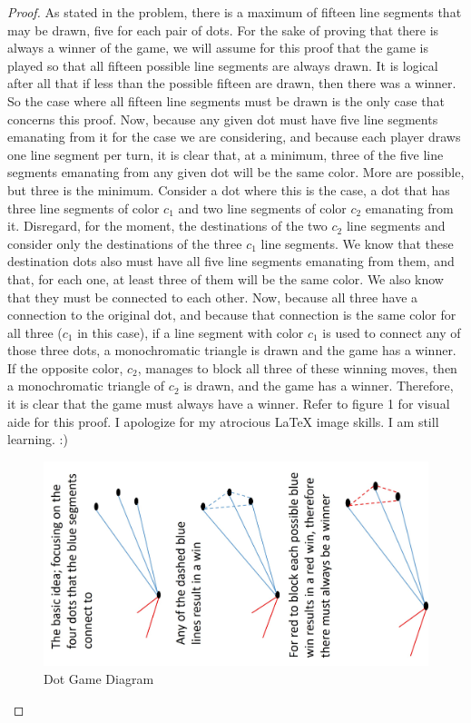 \documentclass[12pt]{article}
\begin{document}
\begin{proof}
As stated in the problem, there is a maximum of fifteen line segments that may be drawn, five for each pair of dots. For the sake of proving that there is always a winner of the game, we will assume for this proof that the game is played so that all fifteen possible line segments are always drawn. It is logical after all that if less than the possible fifteen are drawn, then there was a winner. So the case where all fifteen line segments must be drawn is the only case that concerns this proof. Now, because any given dot must have five line segments emanating from it for the case we are considering, and because each player draws one line segment per turn, it is clear that, at a minimum, three of the five line segments emanating from any given dot will be the same color. More are possible, but three is the minimum. Consider a dot where this is the case, a dot that has three line segments of color $c_1$ and two line segments of color $c_2$ emanating from it. Disregard, for the moment, the destinations of the two $c_2$ line segments and consider only the destinations of the three $c_1$ line segments. We know that these destination dots also must have all five line segments emanating from them, and that, for each one, at least three of them will be the same color. We also know that they must be connected to each other. Now, because all three have a connection to the original dot, and because that connection is the same color for all three ($c_1$ in this case), if a line segment with color $c_1$ is used to connect any of those three dots, a monochromatic triangle is drawn and the game has a winner. If the opposite color, $c_2$, manages to block all three of these winning moves, then a monochromatic triangle of $c_2$ is drawn, and the game has a winner. Therefore, it is clear that the game must always have a winner. Refer to figure 1 for visual aide for this proof. I apologize for my atrocious LaTeX image skills. I am still learning. :)
\begin{figure}[ht!]
\centering
\includegraphics[width=115mm]{Capture}
\caption{Dot Game Diagram}
\end{figure}
\end{proof}
\end{document}
